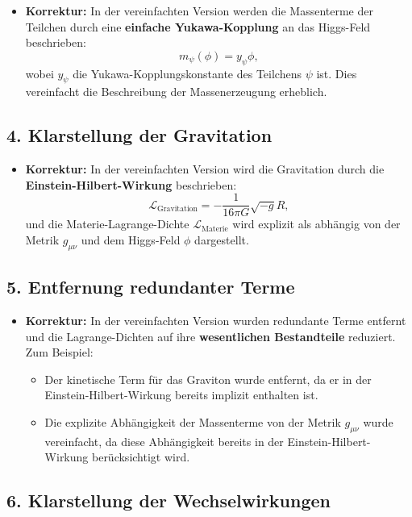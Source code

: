 \documentclass{article}
\begin{document}
	\begin{itemize}
		\item \textbf{Korrektur:} In der vereinfachten Version werden die Massenterme der Teilchen durch eine \textbf{einfache Yukawa-Kopplung} an das Higgs-Feld beschrieben:
		\[
		m_\psi(\phi) = y_\psi \phi,
		\]
		wobei $y_\psi$ die Yukawa-Kopplungskonstante des Teilchens $\psi$ ist. Dies vereinfacht die Beschreibung der Massenerzeugung erheblich.
	\end{itemize}
	
	\subsection{4. Klarstellung der Gravitation}
	
	\begin{itemize}
		\item \textbf{Korrektur:} In der vereinfachten Version wird die Gravitation durch die \textbf{Einstein-Hilbert-Wirkung} beschrieben:
		\[
		\mathcal{L}_\text{Gravitation} = -\frac{1}{16\pi G} \sqrt{-g} R,
		\]
		und die Materie-Lagrange-Dichte $\mathcal{L}_\text{Materie}$ wird explizit als abhängig von der Metrik $g_{\mu\nu}$ und dem Higgs-Feld $\phi$ dargestellt.
	\end{itemize}
	
	\subsection{5. Entfernung redundanter Terme}
	
	\begin{itemize}
		\item \textbf{Korrektur:} In der vereinfachten Version wurden redundante Terme entfernt und die Lagrange-Dichten auf ihre \textbf{wesentlichen Bestandteile} reduziert. Zum Beispiel:
		\begin{itemize}
			\item Der kinetische Term für das Graviton wurde entfernt, da er in der Einstein-Hilbert-Wirkung bereits implizit enthalten ist.
			\item Die explizite Abhängigkeit der Massenterme von der Metrik $g_{\mu\nu}$ wurde vereinfacht, da diese Abhängigkeit bereits in der Einstein-Hilbert-Wirkung berücksichtigt wird.
		\end{itemize}
	\end{itemize}
	
	\subsection{6. Klarstellung der Wechselwirkungen}
	
\end{document}
